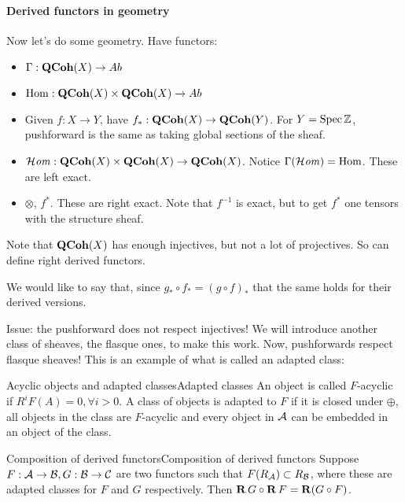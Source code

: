 \paragraph{Derived functors in geometry}
Now let's do some geometry. Have functors:


\begin{itemize}
    \item $\Gamma:\operatorname{\mathbf{QCoh}}(X)\to Ab$
    \item $\operatorname{Hom}: \operatorname{\mathbf{QCoh}}(X)\times \operatorname{\mathbf{QCoh}}(X)\xrightarrow{ }Ab$
    \item Given $f:X\xrightarrow{ }Y$, have $f_*:\operatorname{\mathbf{QCoh}}(X)\to \operatorname{\mathbf{QCoh}}(Y)$. For $Y=\operatorname{Spec}\mathbb{Z}$, pushforward is the same as taking global sections of the sheaf.
    \item $\operatorname{\mathcal{H}\mathit{om}}:\operatorname{\mathbf{QCoh}}(X)\times \operatorname{\mathbf{QCoh}}(X)\to  \operatorname{\mathbf{QCoh}}(X)$. Notice $\Gamma(\operatorname{\mathcal{H}\mathit{om}})=\operatorname{Hom}$. These are left exact.
    \item $\otimes$, $f^*$. These are right exact. Note that $f^{-1}$ is exact, but to get $f^*$ one tensors with the structure sheaf.
\end{itemize}

Note that $\operatorname{\mathbf{QCoh}}(X)$ has enough injectives, but not a lot of projectives. So can define right derived functors.

We would like to say that, since $g_{*}\circ f_{*}=(g\circ f)_{*}$ that the same holds for their derived versions.

Issue: the pushforward does not respect injectives! We will introduce another class of sheaves, the flasque ones, to make this work. Now, pushforwards respect flasque sheaves! This is an example of what is called an adapted class:

\begin{definition}{Acyclic objects and adapted classes}{Adapted classes}
     An object is called $F$-acyclic if $R^iF(A)=0, \forall i>0$. A class of objects is adapted to $F$ if it is closed under $\oplus$, all objects in the class are $F$-acyclic and every object in $\mathcal{A}$ can be embedded in an object of the class.

\end{definition}

\begin{theorem}{Composition of derived functors}{Composition of derived functors}
    Suppose $F:\mathcal{A}\to \mathcal{B}, G:\mathcal{B}\to \mathcal{C}$ are two functors such that $F(R_{\mathcal{A}})\subset R_{\mathcal{B}}$, where these are adapted classes for $F$ and $G$ respectively. Then $\operatorname{\mathbf{R}} G\circ\operatorname{\mathbf{R}} F = \operatorname{\mathbf{R}}(G\circ F)$.
\end{theorem}

